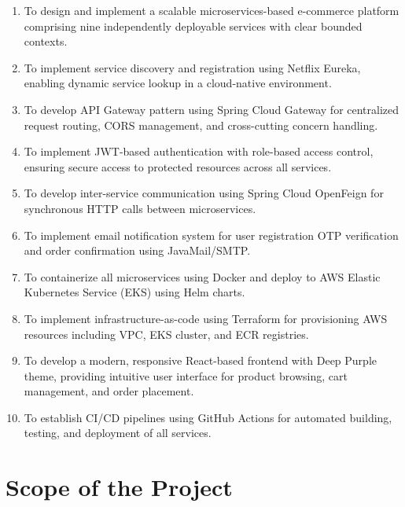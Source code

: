 \begin{enumerate}
    \item To design and implement a scalable microservices-based e-commerce platform comprising nine independently deployable services with clear bounded contexts.
    
    \item To implement service discovery and registration using Netflix Eureka, enabling dynamic service lookup in a cloud-native environment.
    
    \item To develop API Gateway pattern using Spring Cloud Gateway for centralized request routing, CORS management, and cross-cutting concern handling.
    
    \item To implement JWT-based authentication with role-based access control, ensuring secure access to protected resources across all services.
    
    \item To develop inter-service communication using Spring Cloud OpenFeign for synchronous HTTP calls between microservices.
    
    \item To implement email notification system for user registration OTP verification and order confirmation using JavaMail/SMTP.
    
    \item To containerize all microservices using Docker and deploy to AWS Elastic Kubernetes Service (EKS) using Helm charts.
    
    \item To implement infrastructure-as-code using Terraform for provisioning AWS resources including VPC, EKS cluster, and ECR registries.
    
    \item To develop a modern, responsive React-based frontend with Deep Purple theme, providing intuitive user interface for product browsing, cart management, and order placement.
    
    \item To establish CI/CD pipelines using GitHub Actions for automated building, testing, and deployment of all services.
\end{enumerate}

\section{Scope of the Project}


